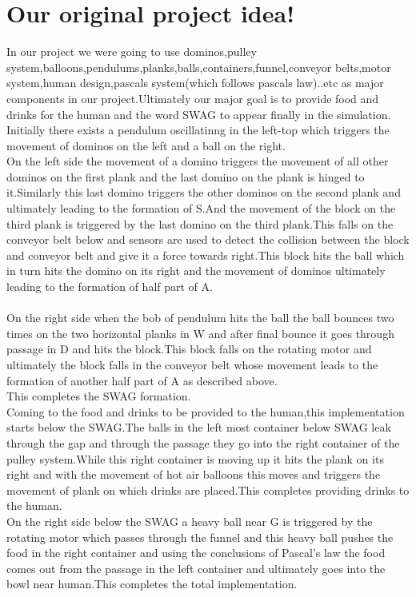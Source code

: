 \documentclass{report}
\begin{document}
\section{Our original project idea!}
In our project we were going to use dominos,pulley system,balloons,pendulums,planks,balls,containers,funnel,conveyor belts,motor system,human design,pascals system(which follows pascals law)..etc as major components in our project.Ultimately our major goal is to provide food and drinks for the human and the word SWAG to appear finally in the simulation.\\
 Initially there exists a pendulum oscillatinng in the left-top which triggers the movement of dominos on the left and a ball on the right.\\
 On the left side the movement of a domino triggers the movement of all other dominos on the first plank and the last domino on the plank is hinged to it.Similarly this last domino triggers the other dominos on the second plank and ultimately leading to the formation of S.And the movement of the block on the third plank is triggered by the last domino on the third plank.This falls on the conveyor belt below and sensors are used to detect the collision between the block and conveyor belt and give it a force towards right.This block hits the ball which in turn hits the domino on its right and the movement of dominos ultimately leading to the formation of half part of A.\\ \\
 On the right side when the bob of pendulum hits the ball the ball bounces two times on the two horizontal planks in W and after final bounce it goes through passage in D and hits the block.This block falls on the rotating motor and ultimately the block falls in the conveyor belt whose movement leads to the formation of another half part of A as described above.\\
 This completes the SWAG formation.\\ 
 Coming to the food and drinks to be provided to the human,this implementation starts below the SWAG.The balls in the left most container below SWAG leak through the gap and through the passage they go into the right container of the pulley system.While this right container is moving up it hits the plank on its right and with the movement of hot air balloons this moves and triggers the movement of plank on which drinks are placed.This completes providing drinks to the human.\\ 
 On the right side below the SWAG a heavy ball near G is triggered by the rotating motor which passes through the funnel and this heavy ball pushes the food in the right container and using the conclusions of Pascal's law the food comes out from the passage in the left container and ultimately goes into the bowl near human.This completes the total implementation.\\ 
 \newpage

\newpage
\end{document}
